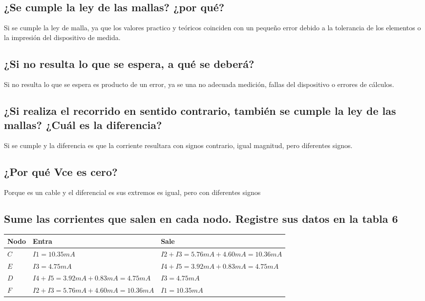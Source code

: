 \documentclass[letterpaper, 12pt]{article}
\begin{document}
\subsection{¿Se cumple la ley de las mallas? ¿por qué?}

Si se cumple la ley de malla, ya que los valores practico y
teóricos coinciden con un pequeño error debido a la
tolerancia de los elementos o la impresión del dispositivo
de medida.

\subsection{¿Si no resulta lo que se espera, a qué se deberá?}

Si no resulta lo que se espera es producto de un error, ya
se una no adecuada medición, fallas del dispositivo o
errores de cálculos.

\subsection{¿Si realiza el recorrido en sentido contrario, también se cumple
	la ley de las mallas? ¿Cuál es la diferencia?}

Si se cumple y la diferencia es que la corriente resultara
con signos contrario, igual magnitud, pero diferentes
signos.

\subsection{¿Por qué Vce es cero?}

Porque es un cable y el diferencial es sus extremos es
igual, pero con diferentes signos

\subsection{Sume las corrientes que salen en cada nodo. Registre sus datos en la tabla 6}

\begin{tabularx}{0.9\linewidth}{|>{\centering\arraybackslash}X|>{\centering\arraybackslash}X|>{\centering\arraybackslash}X|}
	\hline
	Nodo & Entra                                  & Sale                                  \\ \hline
	$C$  & $I1 = 10.35mA$                         & $I2 + I3 = 5.76mA + 4.60mA = 10.36mA$ \\ \hline
	$E$  & $I3 = 4.75mA$                          & $I4 + I5 = 3.92mA + 0.83mA = 4.75mA$  \\ \hline
	$D$  & $I4 + I5 = 3.92mA + 0.83mA = 4.75mA$   & $I3 = 4.75mA$                         \\ \hline
	$F$  & $I2 + I3 = 5.76mA + 4.60mA = 10.36mA $ & $I1 = 10.35mA $                       \\\hline
\end{tabularx}
\end{document}
